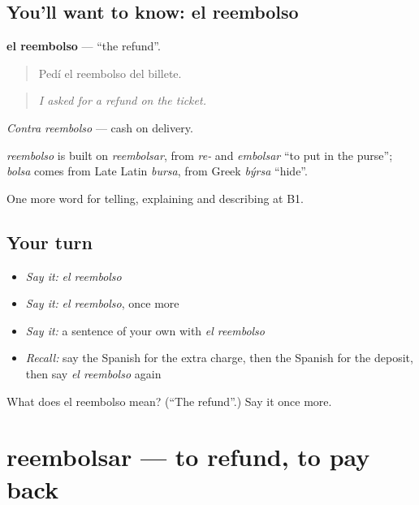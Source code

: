 \subsection*{You'll want to know: el reembolso}
\textbf{el reembolso} — \textquotedblleft{}the refund\textquotedblright{}.

\begin{quote}
Pedí el reembolso del billete.
\end{quote}

\begin{quote}
\emph{I asked for a refund on the ticket.}
\end{quote}

\emph{Contra reembolso} — cash on delivery.

\begin{cousinweb}
\emph{reembolso} is built on \emph{reembolsar}, from \emph{re-} and \emph{embolsar} \textquotedblleft{}to put in the purse\textquotedblright{}; \emph{bolsa} comes from Late Latin \emph{bursa}, from Greek \emph{býrsa} \textquotedblleft{}hide\textquotedblright{}.
\end{cousinweb}

\begin{grammarlens}[title={What you've built}]
One more word for telling, explaining and describing at B1.
\end{grammarlens}

\subsection*{Your turn}
\begin{itemize}
\raggedright
  \item \emph{Say it:} \emph{el reembolso}
  \item \emph{Say it:} \emph{el reembolso}, once more
  \item \emph{Say it:} a sentence of your own with \emph{el reembolso}
  \item \emph{Recall:} say the Spanish for the extra charge, then the Spanish for the deposit, then say \emph{el reembolso} again
\end{itemize}

\begin{tcolorbox}[breakable,colback=teal!4,colframe=teal!35!black,title={Before you move on}]
What does el reembolso mean? (\textquotedblleft{}The refund\textquotedblright{}.) Say it once more.
\end{tcolorbox}
\section[reembolsar]{reembolsar — to refund, to pay back}

